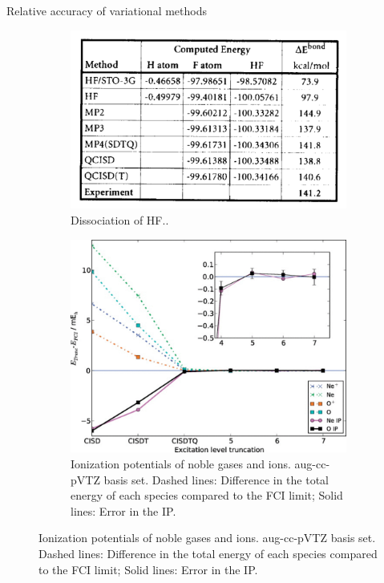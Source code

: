 \documentclass[aspectratio=169]{beamer}
\begin{document}
    \begin{frame}{Relative accuracy of variational methods}
        \begin{figure}
            \centering
            \begin{subfigure}{0.45\textwidth}
                \includegraphics[width=\linewidth]{lectures/figures/3_dissociation_of_HF.png}
                \caption{Dissociation of HF.\cite{foresmanExploringChemistryElectronic1996}.}
            \end{subfigure}
            \begin{subfigure}{0.5\textwidth}
                \includegraphics[width=0.8\linewidth]{lectures/figures/3_ionization_potentials.png}
                \caption{Ionization potentials of noble gases and ions. aug-cc-pVTZ basis set. Dashed lines: Difference in the total energy of each species compared to the FCI limit; Solid lines: Error in the IP.\cite{boothApproachingChemicalAccuracy2010}}
            \end{subfigure}

        \end{figure}

    \end{frame}
\end{document}
